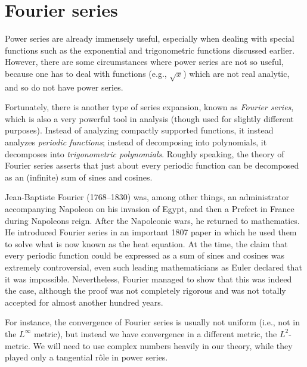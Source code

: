 \chapter{Fourier series}\label{ch:5}

\begin{note}
  Power series are already immensely useful, especially when dealing with special functions such as the exponential and trigonometric functions discussed earlier.
  However, there are some circumstances where power series are not so useful, because one has to deal with functions (e.g., \(\sqrt{x}\)) which are not real analytic, and so do not have power series.
\end{note}

\begin{note}
  Fortunately, there is another type of series expansion, known as \emph{Fourier series}, which is also a very powerful tool in analysis
  (though used for slightly different purposes).
  Instead of analyzing compactly supported functions, it instead analyzes \emph{periodic functions};
  instead of decomposing into polynomials, it decomposes into \emph{trigonometric polynomials}.
  Roughly speaking, the theory of Fourier series asserts that just about every periodic function can be decomposed as an (infinite) sum of sines and cosines.
\end{note}

\begin{rmk}\label{5.0.1}
  Jean-Baptiste Fourier (1768--1830) was, among other things, an administrator accompanying Napoleon on his invasion of Egypt, and then a Prefect in France during Napoleons reign.
  After the Napoleonic wars, he returned to mathematics.
  He introduced Fourier series in an important 1807 paper in which he used them to solve what is now known as the heat equation.
  At the time, the claim that every periodic function could be expressed as a sum of sines and cosines was extremely controversial, even such leading mathematicians as Euler declared that it was impossible.
  Nevertheless, Fourier managed to show that this was indeed the case, although the proof was not completely rigorous and was not totally accepted for almost another hundred years.
\end{rmk}

\begin{note}
  For instance, the convergence of Fourier series is usually not uniform (i.e., not in the \(L^\infty\) metric), but instead we have convergence in a different metric, the \(L^2\)-metric.
  We will need to use complex numbers heavily in our theory, while they played only a tangential rôle in power series.
\end{note}

